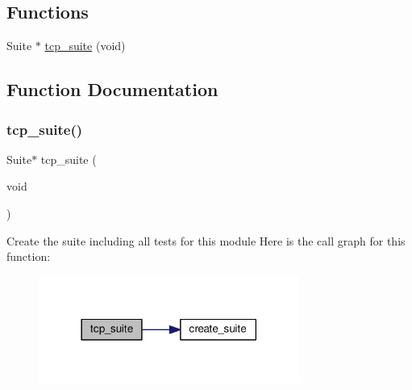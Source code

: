 \subsection*{Functions}
\begin{DoxyCompactItemize}
\item 
Suite $\ast$ \hyperlink{openmote-cc2538_2lwip_2test_2unit_2tcp_2test__tcp_8h_a4a414a246fe56952a357cfa1f7eb53a3}{tcp\+\_\+suite} (void)
\end{DoxyCompactItemize}


\subsection{Function Documentation}
\mbox{\label{openmote-cc2538_2lwip_2test_2unit_2tcp_2test__tcp_8h_a4a414a246fe56952a357cfa1f7eb53a3}} 
\subsubsection{\texorpdfstring{tcp\+\_\+suite()}{tcp\_suite()}}
{\footnotesize\ttfamily Suite$\ast$ tcp\+\_\+suite (\begin{DoxyParamCaption}\item[{void}]{ }\end{DoxyParamCaption})}

Create the suite including all tests for this module Here is the call graph for this function\+:
\nopagebreak
\begin{figure}[H]
\begin{center}
\leavevmode
\includegraphics[width=242pt]{openmote-cc2538_2lwip_2test_2unit_2tcp_2test__tcp_8h_a4a414a246fe56952a357cfa1f7eb53a3_cgraph}
\end{center}
\end{figure}
